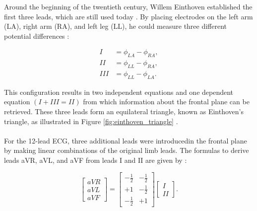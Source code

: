 \noindent Around the beginning of the twentieth century, Willem Einthoven established the first three leads, which are still used today \cite{rivera-ruizEinthovensStringGalvanometer2008}. By placing electrodes on the left arm (LA), right arm (RA), and left leg (LL), he could measure three different potential differences \cite{keenerCardiacRhythmicity1998}:

\begin{equation}
\begin{split}
I &= \phi_{LA} - \phi_{RA}, \\
II &= \phi_{LL} - \phi_{RA}, \\
III &= \phi_{LL} - \phi_{LA}.
\end{split}
\end{equation}

\noindent This configuration results in two independent equations and one dependent equation \((I + III = II)\) from which information about the frontal plane can be retrieved. These three leads form an equilateral triangle, known as Einthoven's triangle, as illustrated in Figure \ref{fig:einthoven_triangle} \cite{lunaMorphologyElectrocardiogram2005}.
\\ \\
For the 12-lead ECG, three additional leads were introducedin the frontal plane by making linear combinations of the original limb leads. The formulas to derive leads aVR, aVL, and aVF from leads I and II are given by \cite{lunaMorphologyElectrocardiogram2005, zhangSynthesisStandard12lead2021,thambawitaDeepFakeElectrocardiogramsUsing2021}:

\begin{equation}
\begin{bmatrix}
    aVR \\
    aVL \\
    aVF
\end{bmatrix}
=
\begin{bmatrix}
    -\frac{1}{2} & -\frac{1}{2} \\
    +1 & -\frac{1}{2} \\
    -\frac{1}{2} & +1
\end{bmatrix}
\begin{bmatrix}
    I \\
    II
\end{bmatrix}.
\end{equation}

